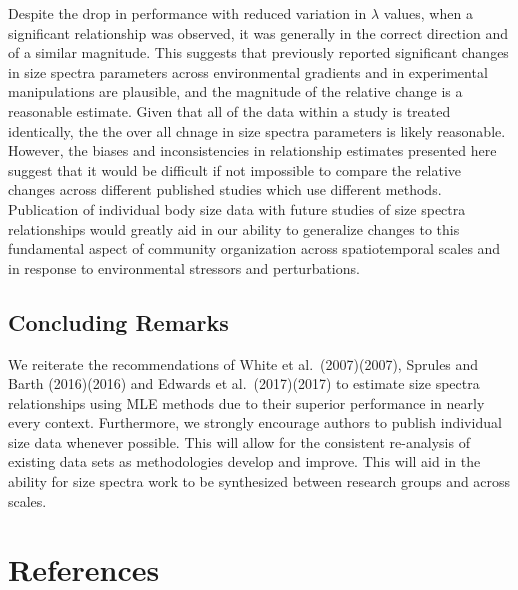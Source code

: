 \documentclass[
]{article}
\begin{document}
Despite the drop in performance with reduced variation in \(\lambda\)
values, when a significant relationship was observed, it was generally
in the correct direction and of a similar magnitude. This suggests that
previously reported significant changes in size spectra parameters
across environmental gradients and in experimental manipulations are
plausible, and the magnitude of the relative change is a reasonable
estimate. Given that all of the data within a study is treated
identically, the the over all chnage in size spectra parameters is
likely reasonable. However, the biases and inconsistencies in
relationship estimates presented here suggest that it would be difficult
if not impossible to compare the relative changes across different
published studies which use different methods. Publication of individual
body size data with future studies of size spectra relationships would
greatly aid in our ability to generalize changes to this fundamental
aspect of community organization across spatiotemporal scales and in
response to environmental stressors and perturbations.

\hypertarget{concluding-remarks}{%
\subsection{Concluding Remarks}\label{concluding-remarks}}

We reiterate the recommendations of White et al.~(2007)(2007), Sprules
and Barth (2016)(2016) and Edwards et al.~(2017)(2017) to estimate size
spectra relationships using MLE methods due to their superior
performance in nearly every context. Furthermore, we strongly encourage
authors to publish individual size data whenever possible. This will
allow for the consistent re-analysis of existing data sets as
methodologies develop and improve. This will aid in the ability for size
spectra work to be synthesized between research groups and across
scales.

\hypertarget{references}{%
\section{References}\label{references}}
\end{document}

